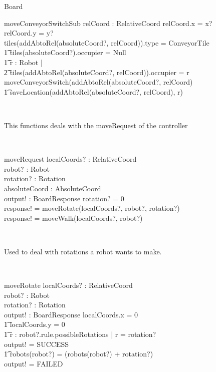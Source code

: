 \begin{class}{Board}
\begin{schema}{moveConveyorSwitchSub}
relCoord : RelativeCoord
\where
relCoord.x = x? \\
relCoord.y = y? \\
\IF tiles(addAbtoRel(absoluteCoord?, relCoord)).type = ConveyorTile \\ \t1
tiles(absoluteCoord?).occupier = Null \\ \t1
\exists r : Robot | \\ \t2 tiles(addAbtoRel(absoluteCoord?, relCoord)).occupier = r \\
\THEN moveConveyorSwitch(addAbtoRel(absoluteCoord?, relCoord)\\ \t1
saveLocation(addAbtoRel(absoluteCoord?, relCoord), r)
\end{schema} \\
\znewpage
\begin{classcom}
This functions deals with the moveRequest of the controller
\end{classcom} \\
\begin{schema}{moveRequest}
localCoords? : RelativeCoord \\
robot? : Robot \\
rotation? : Rotation \\
absoluteCoord : AbsoluteCoord \\
output! : BoardResponse
\where
\IF rotation? \not = 0 \\
\THEN response! = moveRotate(localCoords?, robot?, rotation?) \\
\ELSE response! = moveWalk(localCoords?, robot?)
\end{schema} \\
\begin{classcom}
Used to deal with rotations a robot wants to make.
\end{classcom} \\
\begin{schema}{moveRotate}
localCoords? : RelativeCoord \\
robot? : Robot \\
rotation? : Rotation \\
output! : BoardResponse
\where
\IF localCoords.x = 0 \\ \t1
localCoords.y = 0 \\ \t1
 \exists r : robot?.rule.possibleRotations | r = rotation?\\
\THEN output! = SUCCESS \\ \t1
robots(robot?) = (robots(robot?) + rotation?)  \\
\ELSE output! = FAILED

\end{schema}
\end{class}
